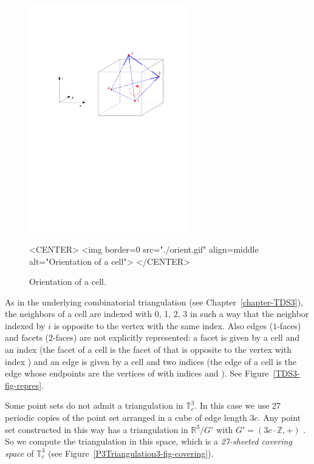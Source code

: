 \begin{figure}[htbp]
\begin{ccTexOnly}
\begin{center} 
\includegraphics[width=7cm]{Periodic_3_triangulation_3/orient} 
\end{center}
\end{ccTexOnly}
\begin{ccHtmlOnly}
<CENTER>
<img border=0 src="./orient.gif" align=middle alt="Orientation of a cell">
</CENTER>
\end{ccHtmlOnly}
\caption{Orientation of a cell.
\label{P3Triangulation3-fig-orient}}
\end{figure} 

As in the underlying combinatorial triangulation (see
Chapter~\ref{chapter-TDS3}), the neighbors of a cell are indexed with
0, 1, 2, 3 in such a way that the neighbor indexed by $i$ is opposite
to the vertex with the same index. Also edges ($1$-faces) and facets
($2$-faces) are not explicitly represented: a facet is given by a cell
and an index (the facet  of a cell  is the facet of
 that is opposite to the vertex with index ) and an edge
is given by a cell and two indices (the edge  of a cell
 is the edge whose endpoints are the vertices of  with
indices  and ). See Figure~\ref{TDS3-fig-repres}.  

Some point sets do not admit a triangulation in $\mathbb T_c^3$. In
this case we use 27 periodic copies of the point set arranged in a
cube of edge length $3c$. Any point set constructed in this way has a
triangulation in $\mathbb R^3/G'$ with $G'=(3c\cdot\mathbb Z,+)$
\cite{cgal:ct-c3pt-09}. So we compute the triangulation in this
space, which is a \emph{27-sheeted covering space} of $\mathbb T_c^3$
(see Figure~\ref{P3Triangulation3-fig-covering}).

